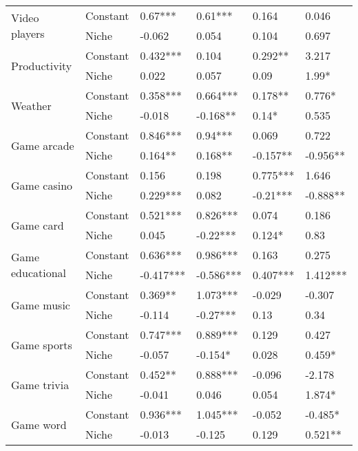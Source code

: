\begin{longtable}[h!]{llllll}
\cline{1-6}
\multirow{2}{*}{Video players} & Constant &             0.67*** &     0.61*** &      0.164 &      0.046 \\
          & Niche &              -0.062 &       0.054 &      0.104 &      0.697 \\
\cline{1-6}
\multirow{2}{*}{Productivity} & Constant &            0.432*** &       0.104 &    0.292** &      3.217 \\
          & Niche &               0.022 &       0.057 &       0.09 &      1.99* \\
\cline{1-6}
\multirow{2}{*}{Weather} & Constant &            0.358*** &    0.664*** &    0.178** &     0.776* \\
          & Niche &              -0.018 &    -0.168** &      0.14* &      0.535 \\
\cline{1-6}
\multirow{2}{*}{Game arcade} & Constant &            0.846*** &     0.94*** &      0.069 &      0.722 \\
          & Niche &             0.164** &     0.168** &   -0.157** &   -0.956** \\
\cline{1-6}
\multirow{2}{*}{Game casino} & Constant &               0.156 &       0.198 &   0.775*** &      1.646 \\
          & Niche &            0.229*** &       0.082 &   -0.21*** &   -0.888** \\
\cline{1-6}
\multirow{2}{*}{Game card} & Constant &            0.521*** &    0.826*** &      0.074 &      0.186 \\
          & Niche &               0.045 &    -0.22*** &     0.124* &       0.83 \\
\cline{1-6}
\multirow{2}{*}{Game educational} & Constant &            0.636*** &    0.986*** &      0.163 &      0.275 \\
          & Niche &           -0.417*** &   -0.586*** &   0.407*** &   1.412*** \\
\cline{1-6}
\multirow{2}{*}{Game music} & Constant &             0.369** &    1.073*** &     -0.029 &     -0.307 \\
          & Niche &              -0.114 &    -0.27*** &       0.13 &       0.34 \\
\cline{1-6}
\multirow{2}{*}{Game sports} & Constant &            0.747*** &    0.889*** &      0.129 &      0.427 \\
          & Niche &              -0.057 &     -0.154* &      0.028 &     0.459* \\
\cline{1-6}
\multirow{2}{*}{Game trivia} & Constant &             0.452** &    0.888*** &     -0.096 &     -2.178 \\
          & Niche &              -0.041 &       0.046 &      0.054 &     1.874* \\
\cline{1-6}
\multirow{2}{*}{Game word} & Constant &            0.936*** &    1.045*** &     -0.052 &    -0.485* \\
          & Niche &              -0.013 &      -0.125 &      0.129 &    0.521** \\
\end{longtable}

